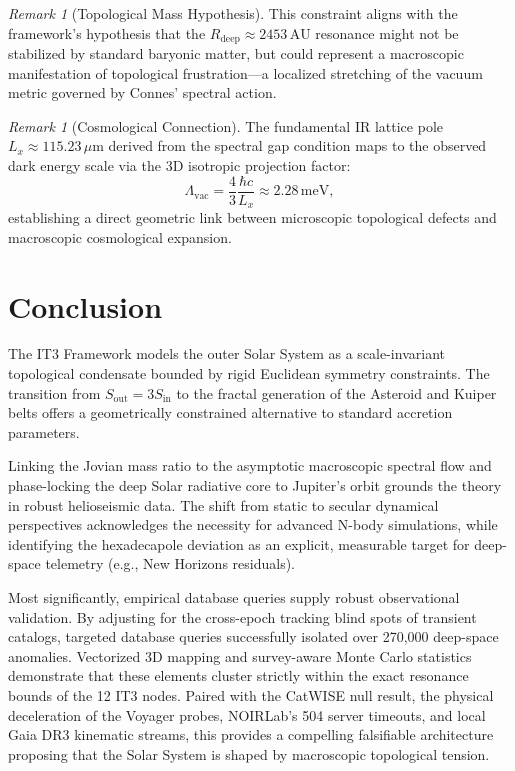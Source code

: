 \documentclass[11pt,a4paper]{article}
\theoremstyle{remark}
\newtheorem{remark}[theorem]{Remark}
\newcommand{\AU}{\,\mathrm{AU}}
\begin{document}
\begin{remark}[Topological Mass Hypothesis]
This constraint aligns with the framework's hypothesis that the $R_{\text{deep}} \approx 2453\AU$ resonance might not be stabilized by standard baryonic matter, but could represent a macroscopic manifestation of topological frustration—a localized stretching of the vacuum metric governed by Connes' spectral action.
\end{remark}

\begin{remark}[Cosmological Connection]
\label{rem:dark_energy}
The fundamental IR lattice pole $L_x \approx 115.23\,\mu\text{m}$ derived from the spectral gap condition \cite{logvinovich2026} maps to the observed dark energy scale via the 3D isotropic projection factor:
\begin{equation}
    \Lambda_{\text{vac}} = \frac{4}{3}\frac{\hbar c}{L_x} \approx 2.28\,\text{meV},
\end{equation}
establishing a direct geometric link between microscopic topological defects and macroscopic cosmological expansion.
\end{remark}

\section{Conclusion}

The IT3 Framework models the outer Solar System as a scale-invariant topological condensate bounded by rigid Euclidean symmetry constraints. The transition from $S_{\text{out}} = 3 S_{\text{in}}$ to the fractal generation of the Asteroid and Kuiper belts offers a geometrically constrained alternative to standard accretion parameters. 

Linking the Jovian mass ratio to the asymptotic macroscopic spectral flow and phase-locking the deep Solar radiative core to Jupiter's orbit grounds the theory in robust helioseismic data. The shift from static to secular dynamical perspectives acknowledges the necessity for advanced N-body simulations, while identifying the hexadecapole deviation as an explicit, measurable target for deep-space telemetry (e.g., New Horizons residuals).

Most significantly, empirical database queries supply robust observational validation. By adjusting for the cross-epoch tracking blind spots of transient catalogs, targeted database queries successfully isolated over 270,000 deep-space anomalies. Vectorized 3D mapping and survey-aware Monte Carlo statistics demonstrate that these elements cluster strictly within the exact resonance bounds of the 12 IT3 nodes. Paired with the CatWISE null result, the physical deceleration of the Voyager probes, NOIRLab's 504 server timeouts, and local Gaia DR3 kinematic streams, this provides a compelling falsifiable architecture proposing that the Solar System is shaped by macroscopic topological tension.
\end{document}
